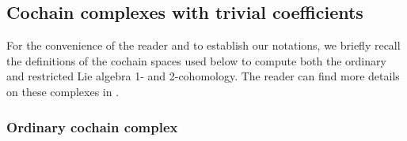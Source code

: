 \documentclass[pdftex]{sigma}
\numberwithin{equation}{section}
\begin{document}
\subsection{Cochain complexes with trivial coefficients}

For the convenience of the reader and to establish our notations, we
briefly recall the definitions of the cochain spaces used below to
compute both the ordinary and restricted Lie algebra 1- and
2-cohomology. The reader can find more details on these complexes in
\cite{ChevalleyEilenberg1948,EvFi2017,EvFi2019,FuchsBook,Hochschild1954}.

\subsubsection{Ordinary cochain complex}
\end{document}
